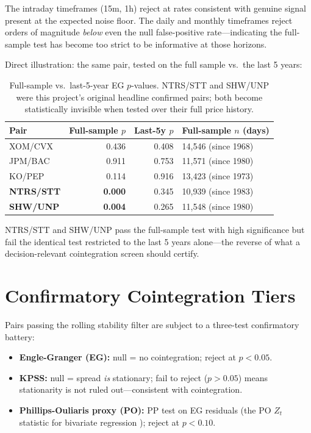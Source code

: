 \documentclass[12pt,a4paper]{article}
\begin{document}
The intraday timeframes (15m, 1h) reject at rates consistent with genuine signal
present at the expected noise floor. The daily and monthly timeframes reject orders
of magnitude \emph{below} even the null false-positive rate---indicating the
full-sample test has become too strict to be informative at those horizons.

Direct illustration: the same pair, tested on the full sample vs.\ the last 5 years:

\begin{table}[htbp]
\centering
\caption{Full-sample vs.\ last-5-year EG $p$-values. NTRS/STT and SHW/UNP
were this project's original headline confirmed pairs; both become statistically
invisible when tested over their full price history.}
\label{tab:strictness_pairs}
\small
\begin{tabular}{lrrl}
\toprule
Pair & Full-sample $p$ & Last-5y $p$ & Full-sample $n$ (days) \\
\midrule
XOM/CVX   & 0.436 & 0.408 & 14,546 (since 1968) \\
JPM/BAC   & 0.911 & 0.753 & 11,571 (since 1980) \\
KO/PEP    & 0.114 & 0.916 & 13,423 (since 1973) \\
\textbf{NTRS/STT} & \textbf{0.000} & 0.345 & 10,939 (since 1983) \\
\textbf{SHW/UNP}  & \textbf{0.004} & 0.265 & 11,548 (since 1980) \\
\bottomrule
\end{tabular}
\end{table}

NTRS/STT and SHW/UNP pass the full-sample test with high significance but fail
the identical test restricted to the last 5 years alone---the reverse of what a
decision-relevant cointegration screen should certify.

\section{Confirmatory Cointegration Tiers}

Pairs passing the rolling stability filter are subject to a three-test
confirmatory battery:
\begin{itemize}
  \item \textbf{Engle-Granger (EG):} null = no cointegration; reject at $p < 0.05$.
  \item \textbf{KPSS:} null = spread \emph{is} stationary; fail to reject ($p > 0.05$)
    means stationarity is not ruled out---consistent with cointegration.
  \item \textbf{Phillips-Ouliaris proxy (PO):} PP test on EG residuals (the
    PO $Z_t$ statistic for bivariate regression \citep{phillips_ouliaris1990});
    reject at $p < 0.10$.
\end{itemize}
\end{document}
